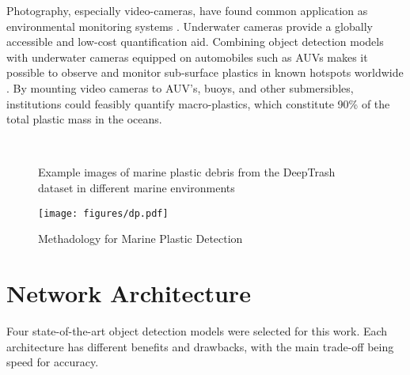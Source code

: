 \documentclass[a4paper,fleqn]{cas-dc}
\begin{document}
Photography, especially video-cameras, have found common application as environmental monitoring systems \cite{mock1995underwater} \cite{premkumardeepak2017intelligent}. Underwater cameras provide a globally accessible and low-cost quantification aid. Combining object detection models with underwater cameras equipped on automobiles such as AUVs makes it possible to observe and monitor sub-surface plastics in known hotspots worldwide \cite{fulton2018robotic}. By mounting video cameras to AUV’s, buoys, and other submersibles, institutions could feasibly quantify macro-plastics, which constitute 90\% of the total plastic mass in the oceans.


\

\begin{figure}[ht]
    \centering
{}
    \caption{Example images of marine plastic debris from the DeepTrash dataset in different marine environments}
\label{fig_plastic}
\end{figure}

\begin{figure*}[!t]
\centering
\texttt{[image: figures/dp.pdf]}
\caption{Methadology for Marine Plastic Detection}
\label{fig_met}
\end{figure*}


\section{Network Architecture}

Four state-of-the-art object detection models were selected for this work. Each architecture has different benefits and drawbacks, with the main trade-off being speed for accuracy.
\end{document}
